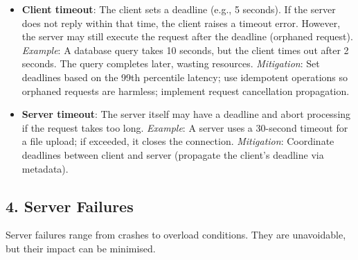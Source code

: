\documentclass[10pt,a4paper]{article}
\begin{document}
\begin{itemize}
    \item \textbf{Client timeout}: The client sets a deadline (e.g., 5 seconds). If the server does not reply within that time, the client raises a timeout error. However, the server may still execute the request after the deadline (orphaned request).  
        \textit{Example}: A database query takes 10 seconds, but the client times out after 2 seconds. The query completes later, wasting resources.  
        \textit{Mitigation}: Set deadlines based on the 99th percentile latency; use idempotent operations so orphaned requests are harmless; implement request cancellation propagation.
    
    \item \textbf{Server timeout}: The server itself may have a deadline and abort processing if the request takes too long.  
        \textit{Example}: A server uses a 30-second timeout for a file upload; if exceeded, it closes the connection.  
        \textit{Mitigation}: Coordinate deadlines between client and server (propagate the client’s deadline via metadata).
\end{itemize}

\subsection{4. Server Failures}
Server failures range from crashes to overload conditions. They are unavoidable, but their impact can be minimised.
\end{document}
